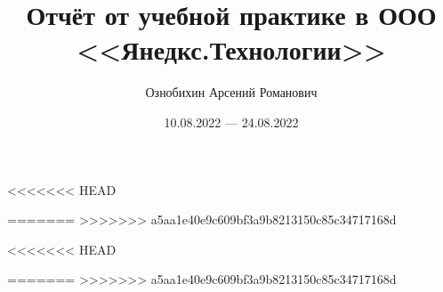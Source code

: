 \documentclass{book}
\begin{document}
\small


<<<<<<< HEAD
	\title{Отчёт от учебной практике в ООО <<Янедкс.Технологии>>}
	\author{Ознобихин Арсений Романович}
	\date{10.08.2022 --- 24.08.2022}
=======
>>>>>>> a5aa1e40e9c609bf3a9b8213150c85c34717168d
	

<<<<<<< HEAD
	
=======
>>>>>>> a5aa1e40e9c609bf3a9b8213150c85c34717168d
\end{document}
